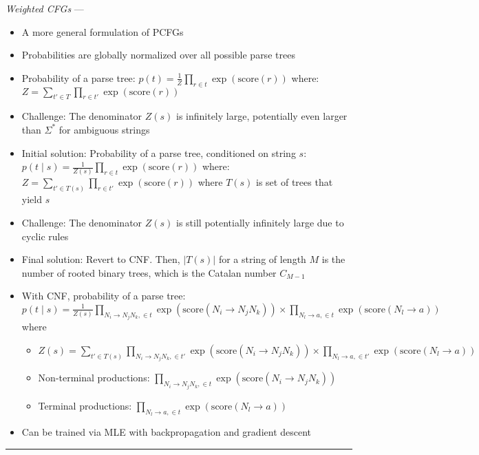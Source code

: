 \emph{Weighted CFGs} ---
\begin{itemize}
    \item A more general formulation of PCFGs
    \item Probabilities are globally normalized over all possible parse trees
    \item Probability of a parse tree:
    $
    p(t) = \frac{1}{Z} \prod_{r \in t} \exp(\textrm{score}(r))
    $
    where:
    $
    Z = \sum_{t' \in T} \prod_{r \in t'} \exp(\textrm{score}(r))
    $
    \item Challenge: The denominator $Z(s)$ is infinitely large, potentially even larger than $\Sigma^*$ for ambiguous strings
    \item Initial solution: Probability of a parse tree, conditioned on string $s$:
    $
    p(t \mid s) = \frac{1}{Z(s)} \prod_{r \in t} \exp(\textrm{score}(r))
    $
    where:
    $
    Z = \sum_{t' \in T(s)} \prod_{r \in t'} \exp(\textrm{score}(r))
    $ 
    where $T(s)$ is set of trees that yield $s$
    \item Challenge: The denominator $Z(s)$ is still potentially infinitely large due to cyclic rules
    \item Final solution: Revert to CNF. Then, $|T(s)|$ for a string of length $M$ is the number of rooted binary trees, which is the Catalan number $C_{M-1}$
    \item With CNF, probability of a parse tree:
    $p(t \mid s) = \frac{1}{Z(s)} \prod_{N_i \to N_j N_k, \in t} \exp(\textrm{score}(N_i \to N_j N_k)) \times \prod_{N_l \to a, \in t} \exp(\textrm{score}(N_l \to a))$ where
    \begin{itemize}
        \item $Z(s) = \sum_{t' \in T(s)} \prod_{N_i \to N_j N_k, \in t'} \exp(\textrm{score}(N_i \to N_j N_k)) \times \prod_{N_l \to a, \in t'} \exp(\textrm{score}(N_l \to a))$
        \item Non-terminal productions: $\prod_{N_i \to N_j N_k, \in t} \exp(\textrm{score}(N_i \to N_j N_k))$
        \item Terminal productions: $\prod_{N_l \to a, \in t} \exp(\textrm{score}(N_l \to a))$
    \end{itemize}
    \item Can be trained via MLE with backpropagation and gradient descent
\end{itemize}

{\color{lightgray}\hrule height 0.001mm}

